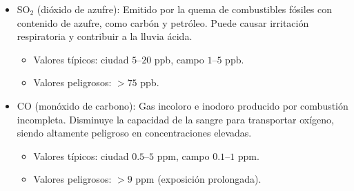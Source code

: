 \documentclass{article}
\begin{document}
\begin{itemize}
        \item SO$_2$ (dióxido de azufre): Emitido por la quema de combustibles fósiles con contenido de azufre, como carbón y petróleo. Puede causar irritación respiratoria y contribuir a la lluvia ácida.
        \begin{itemize}
            \item Valores típicos: ciudad $5$--$20$ ppb, campo $1$--$5$ ppb.
            \item Valores peligrosos: $>75$ ppb.
        \end{itemize}
        
        \item CO (monóxido de carbono): Gas incoloro e inodoro producido por combustión incompleta. Disminuye la capacidad de la sangre para transportar oxígeno, siendo altamente peligroso en concentraciones elevadas.
        \begin{itemize}
            \item Valores típicos: ciudad $0.5$--$5$ ppm, campo $0.1$--$1$ ppm.
            \item Valores peligrosos: $>9$ ppm (exposición prolongada).
        \end{itemize}    
    \end{itemize}
\end{document}

